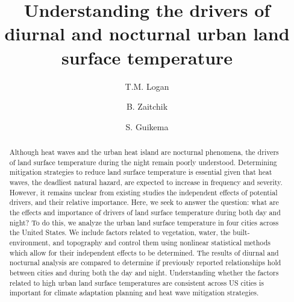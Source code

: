 \documentclass[]{elsarticle}
\begin{document}
\begin{frontmatter}

\title{Understanding the drivers of diurnal and nocturnal urban land surface temperature}

\author[1]{T.M. Logan}

\author[2]{B. Zaitchik}
\author[1]{S. Guikema}


\address[1]{Industrial and Operations Engineering, University of Michigan, Ann Arbor, MI}
\address[2]{Earth and Planetary Sciences, Johns Hopkins University, Baltimore, MD}

\begin{abstract}
Although heat waves and the urban heat island are nocturnal phenomena, the drivers of land surface temperature during the night remain poorly understood.
Determining mitigation strategies to reduce land surface temperature is essential given that heat waves, the deadliest natural hazard, are expected to increase in frequency and severity.
However, it remains unclear from existing studies the independent effects of potential drivers, and their relative importance.
Here, we seek to answer the question: what are the effects and importance of drivers of land surface temperature during both day and night?
To do this, we analyze the urban land surface temperature in four cities across the United States.
We include factors related to vegetation, water, the built-environment, and topography and control them using nonlinear statistical methods which allow for their independent effects to be determined.
The results of diurnal and nocturnal analysis are compared to determine if previously reported relationships hold between cities and during both the day and night.
Understanding whether the factors related to high urban land surface temperatures are consistent across US cities is important for climate adaptation planning and heat wave mitigation strategies.
\end{abstract}

\begin{keyword}

\end{keyword}

\end{frontmatter}
\end{document}
